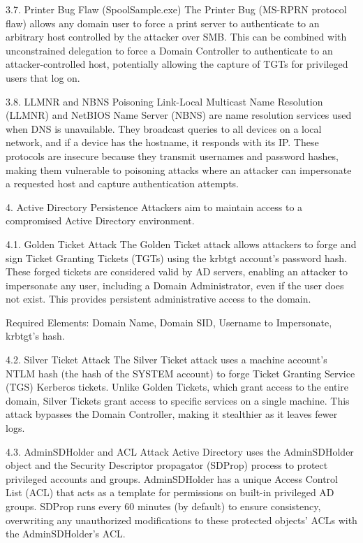 3.7. Printer Bug Flaw (SpoolSample.exe)
The Printer Bug (MS-RPRN protocol flaw) allows any domain user to force a print server to authenticate to an arbitrary host controlled by the attacker over SMB. This can be combined with unconstrained delegation to force a Domain Controller to authenticate to an attacker-controlled host, potentially allowing the capture of TGTs for privileged users that log on.

3.8. LLMNR and NBNS Poisoning
Link-Local Multicast Name Resolution (LLMNR) and NetBIOS Name Server (NBNS) are name resolution services used when DNS is unavailable. They broadcast queries to all devices on a local network, and if a device has the hostname, it responds with its IP. These protocols are insecure because they transmit usernames and password hashes, making them vulnerable to poisoning attacks where an attacker can impersonate a requested host and capture authentication attempts.

4. Active Directory Persistence
Attackers aim to maintain access to a compromised Active Directory environment.

4.1. Golden Ticket Attack
The Golden Ticket attack allows attackers to forge and sign Ticket Granting Tickets (TGTs) using the krbtgt account's password hash. These forged tickets are considered valid by AD servers, enabling an attacker to impersonate any user, including a Domain Administrator, even if the user does not exist. This provides persistent administrative access to the domain.

Required Elements: Domain Name, Domain SID, Username to Impersonate, krbtgt's hash.

4.2. Silver Ticket Attack
The Silver Ticket attack uses a machine account's NTLM hash (the hash of the SYSTEM account) to forge Ticket Granting Service (TGS) Kerberos tickets. Unlike Golden Tickets, which grant access to the entire domain, Silver Tickets grant access to specific services on a single machine. This attack bypasses the Domain Controller, making it stealthier as it leaves fewer logs.

4.3. AdminSDHolder and ACL Attack
Active Directory uses the AdminSDHolder object and the Security Descriptor propagator (SDProp) process to protect privileged accounts and groups. AdminSDHolder has a unique Access Control List (ACL) that acts as a template for permissions on built-in privileged AD groups. SDProp runs every 60 minutes (by default) to ensure consistency, overwriting any unauthorized modifications to these protected objects' ACLs with the AdminSDHolder's ACL.

